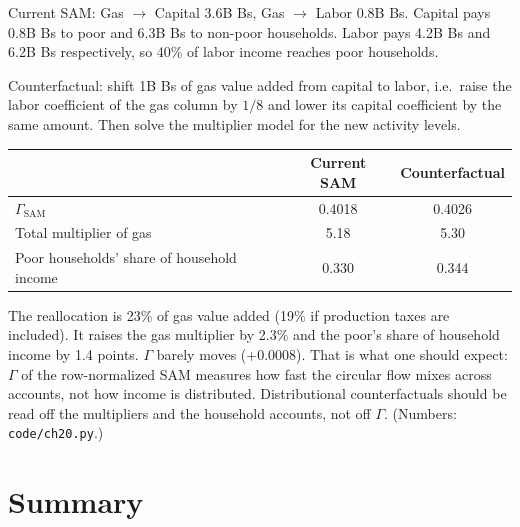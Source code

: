 \documentclass[../structural_economics_book.tex]{subfiles}
\begin{document}
\begin{example}\label{ch20:ex:counterfactual}
Current SAM: Gas $\to$ Capital 3.6B Bs, Gas $\to$ Labor 0.8B Bs. Capital pays 0.8B Bs to poor and 6.3B Bs to non-poor households. Labor pays 4.2B Bs and 6.2B Bs respectively, so 40\% of labor income reaches poor households.

Counterfactual: shift 1B Bs of gas value added from capital to labor, i.e.\ raise the labor coefficient of the gas column by $1/8$ and lower its capital coefficient by the same amount. Then solve the multiplier model for the new activity levels.

\begin{center}
\begin{tabular}{lcc}
\toprule
& Current SAM & Counterfactual \\
\midrule
$\Gamma_{\text{SAM}}$ & 0.4018 & 0.4026 \\
Total multiplier of gas & 5.18 & 5.30 \\
Poor households' share of household income & 0.330 & 0.344 \\
\bottomrule
\end{tabular}
\end{center}

The reallocation is 23\% of gas value added (19\% if production taxes are included). It raises the gas multiplier by 2.3\% and the poor's share of household income by 1.4 points. $\Gamma$ barely moves ($+0.0008$). That is what one should expect: $\Gamma$ of the row-normalized SAM measures how fast the circular flow mixes across accounts, not how income is distributed. Distributional counterfactuals should be read off the multipliers and the household accounts, not off $\Gamma$. (Numbers: \texttt{code/ch20.py}.)
\end{example}


\section{Summary}
\label{ch20:sec:summary}
\end{document}
